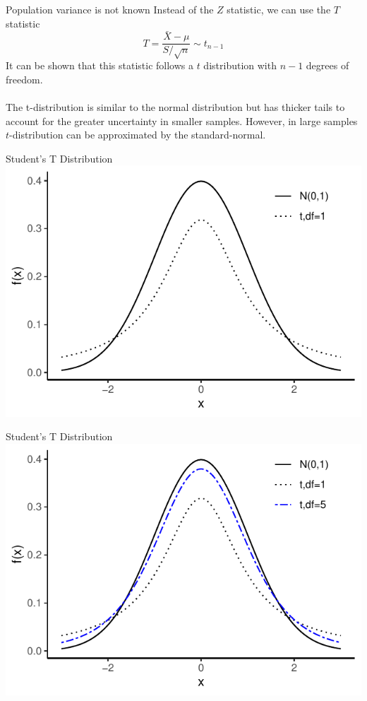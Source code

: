 \documentclass{./../div_teaching_slides}
\begin{document}
\begin{frame}{Population variance is not known}
Instead of the $Z$ statistic, we can use the $T$ statistic
$$ T = \frac{\bar{X}-\mu}{S/\sqrt{n}} \sim t_{n-1} $$ 
It can be shown that this statistic follows a $t$ distribution with $n-1$ degrees of freedom. \\~\\
The t-distribution is similar to the normal distribution but has thicker tails to account for the greater uncertainty in smaller samples. However, in large samples $t$-distribution can be approximated by the standard-normal.
\end{frame}

\begin{frame}{Student's T Distribution}
\centering
	\includegraphics{./../../Output/tdist1.pdf} 
\end{frame}

\begin{frame}{Student's T Distribution}
\centering
	\includegraphics{./../../Output/tdist2.pdf} 
\end{frame}
\end{document}
